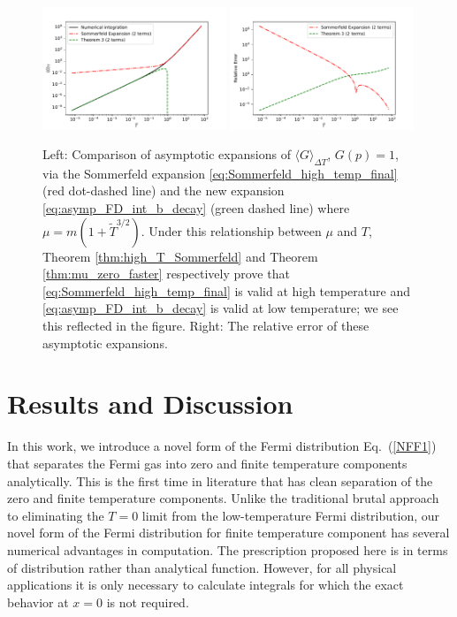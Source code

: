 \documentclass[sn-mathphys,Numbered]{sn-jnl}
\newcommand*{\xgreen}{\color{green}}
\begin{document}
\begin{figure}
\centering
\includegraphics[width=0.49\textwidth]{./plot/Sommerfeld_high_temp_comparison.pdf}
\includegraphics[width=0.49\textwidth]{./plot/Sommerfeld_high_temp_relative_error_comparison.pdf}
\caption{Left: Comparison of asymptotic expansions of $\langle G\rangle_{\Delta T}$, $G(p)=1$, via the Sommerfeld expansion \eqref{eq:Sommerfeld_high_temp_final} (red dot-dashed line) and the new expansion  \eqref{eq:asymp_FD_int_b_decay}  (green dashed  line) where  $\mu=m(1+\widetilde{T}^{3/2})$.  Under this relationship between $\mu$ and $T$, Theorem \ref{thm:high_T_Sommerfeld} and Theorem \ref{thm:mu_zero_faster} respectively prove that \eqref{eq:Sommerfeld_high_temp_final} is valid at high temperature and \eqref{eq:asymp_FD_int_b_decay} is valid at low temperature; we see this reflected in the figure. Right: The relative error of these asymptotic expansions.  }\label{fig:FD_avg_expansion_comparison_Sommerfeld}
\end{figure}





\section{Results and Discussion}
\label{sec12}
In this work, we introduce a novel form of the Fermi distribution Eq.~(\ref{NFF1}) that separates the Fermi gas into zero and finite temperature components analytically. This is the first time in literature that has clean separation of the zero and finite temperature components. Unlike the traditional brutal approach to eliminating the $T=0$ limit from the low-temperature Fermi distribution, our novel form of the Fermi distribution for finite temperature component has several numerical advantages in computation. {\xgreen The prescription proposed here is in terms of distribution rather than analytical function. However, for all physical applications it is only necessary to calculate integrals for which the exact behavior at $x=0$ is not required.}
\end{document}
